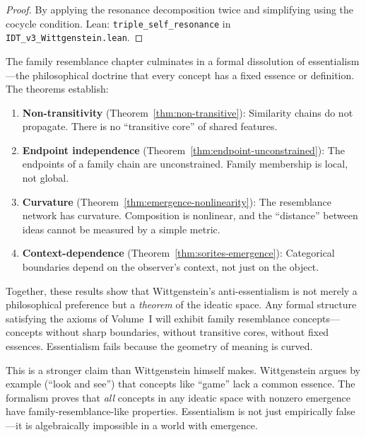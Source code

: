 \begin{proof}
By applying the resonance decomposition twice and simplifying using the
cocycle condition.
Lean: \texttt{triple\_self\_resonance} in \texttt{IDT\_v3\_Wittgenstein.lean}.
\end{proof}

\begin{interpretation}
The family resemblance chapter culminates in a formal dissolution of
essentialism---the philosophical doctrine that every concept has a fixed
essence or definition. The theorems establish:

\begin{enumerate}
\item \textbf{Non-transitivity} (Theorem~\ref{thm:non-transitive}): Similarity
chains do not propagate. There is no ``transitive core'' of shared features.

\item \textbf{Endpoint independence} (Theorem~\ref{thm:endpoint-unconstrained}):
The endpoints of a family chain are unconstrained. Family membership is local,
not global.

\item \textbf{Curvature} (Theorem~\ref{thm:emergence-nonlinearity}): The
resemblance network has curvature. Composition is nonlinear, and the
``distance'' between ideas cannot be measured by a simple metric.

\item \textbf{Context-dependence} (Theorem~\ref{thm:sorites-emergence}):
Categorical boundaries depend on the observer's context, not just on the
object.
\end{enumerate}

Together, these results show that Wittgenstein's anti-essentialism is not merely
a philosophical preference but a \emph{theorem} of the ideatic space. Any formal
structure satisfying the axioms of Volume~I will exhibit family resemblance
concepts---concepts without sharp boundaries, without transitive cores, without
fixed essences. Essentialism fails because the geometry of meaning is curved.

This is a stronger claim than Wittgenstein himself makes. Wittgenstein argues
by example (``look and see'') that concepts like ``game'' lack a common essence.
The formalism proves that \emph{all} concepts in any ideatic space with nonzero
emergence have family-resemblance-like properties. Essentialism is not just
empirically false---it is algebraically impossible in a world with emergence.
\end{interpretation}

